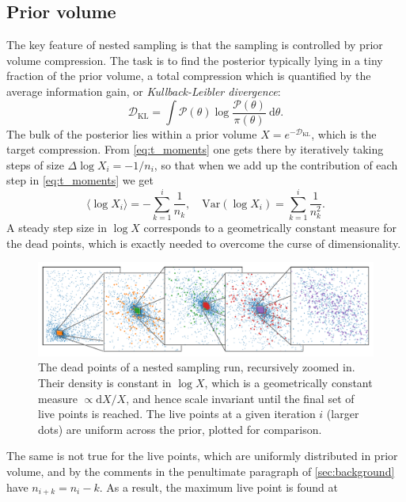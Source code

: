 \documentclass[usenatbib]{mnras}
\newcommand{\DKL}{\mathcal{D}_\mathrm{KL}}
\begin{document}
\subsection{Prior volume}\label{sec:prior_volume}
The key feature of nested sampling is that the sampling is controlled by prior volume compression. The task is to find the posterior typically lying in a tiny fraction of the prior volume, a total compression which is quantified by the average information gain, or \textit{Kullback-Leibler divergence}:
\begin{equation}\label{eq:DKL}
   \DKL = \int \mathcal{P}(\theta) \log \frac{\mathcal{P}(\theta)}{\pi(\theta)}\ \mathrm{d}\theta. 
\end{equation}
The bulk of the posterior lies within a prior volume ${X = e^{-\DKL}}$, which is the target compression. From \cref{eq:t_moments} one gets there by iteratively taking steps of size ${\Delta \log X_i = -1/n_i}$, so that when we add up the contribution of each step in \eqref{eq:t_moments} we get
\begin{equation}
    \langle\log X_i\rangle = -\sum_{k=1}^i \frac{1}{n_k}, \quad \mathrm{Var}(\log X_i) = \sum_{k=1}^i \frac{1}{n_k^2}.
\end{equation}
A steady step size in $\log X$ corresponds to a geometrically constant measure for the dead points, which is exactly needed to overcome the curse of dimensionality.
\begin{figure}
\begin{center}
    \includegraphics{figures/dead_measure_live.pdf}
\end{center}
\caption{The dead points of a nested sampling run, recursively zoomed in. Their density is constant in $\log X$, which is a geometrically constant measure $\propto \mathrm{d} X/X$, and hence scale invariant until the final set of live points is reached. The live points at a given iteration $i$ (larger dots) are uniform across the prior, plotted for comparison.}
\label{fig:dead_measure}
\end{figure}
\par
The same is not true for the live points, which are uniformly distributed in prior volume, and by the comments in the penultimate paragraph of \cref{sec:background} have ${n_{i+k} = n_i-k}$. As a result, the maximum live point is found at 
\end{document}
